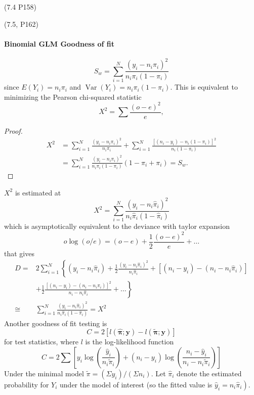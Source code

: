 \documentclass[11pt]{article}
\theoremstyle{definition}
\begin{document}
(7.4 P158)

(7.5, P162)
\paragraph{Binomial GLM Goodness of fit}
$$
S_w=\sum_{i=1}^N \frac{\left(y_i-n_i \pi_i\right)^2}{n_i \pi_i\left(1-\pi_i\right)}
$$
since $E\left(Y_i\right)=n_i \pi_i$ and $\operatorname{Var}\left(Y_i\right)=n_i \pi_i\left(1-\pi_i\right)$.
This is equivalent to minimizing the Pearson chi-squared statistic
$$
X^2=\sum \frac{(o-e)^2}{e},
$$
\begin{proof}
    $$
\begin{aligned}
X^2 & =\sum_{i=1}^N \frac{\left(y_i-n_i \pi_i\right)^2}{n_i \pi_i}+\sum_{i=1}^N \frac{\left[\left(n_i-y_i\right)-n_i\left(1-\pi_i\right)\right]^2}{n_i\left(1-\pi_i\right)} \\
& =\sum_{i=1}^N \frac{\left(y_i-n_i \pi_i\right)^2}{n_i \pi_i\left(1-\pi_i\right)}\left(1-\pi_i+\pi_i\right)=S_w .
\end{aligned}
$$
\end{proof}
$X^2$ is estimated at
$$
X^2=\sum_{i=1}^N \frac{\left(y_i-n_i \widehat{\pi}_i\right)^2}{n_i \widehat{\pi}_i\left(1-\widehat{\pi}_i\right)}
$$
which is asymptotically equivalent to the deviance
with taylor expansion
$$
o\log(o/e) = (o-e) + \frac{1}{2}\frac{(o-e)^2}{e}+\dots
$$
that gives
$$
\begin{aligned}
D = & 2 \sum_{i=1}^N\left\{\left(y_i-n_i \widehat{\pi}_i\right)+\frac{1}{2} \frac{\left(y_i-n_i \widehat{\pi}_i\right)^2}{n_i \widehat{\pi}_i}+\left[\left(n_i-y_i\right)-\left(n_i-n_i \widehat{\pi}_i\right)\right]\right. \\
& \left.+\frac{1}{2} \frac{\left[\left(n_i-y_i\right)-\left(n_i-n_i \widehat{\pi}_i\right)\right]^2}{n_i-n_i \widehat{\pi}_i}+\ldots\right\} \\
\cong & \sum_{i=1}^N \frac{\left(y_i-n_i \widehat{\pi}_i\right)^2}{n_i \widehat{\pi}_i\left(1-\widehat{\pi}_i\right)}=X^2 
\end{aligned}
$$
Another goodness of fit testing is 
$$
C=2[l(\widehat{\boldsymbol{\pi}} ; \mathbf{y})-l(\widetilde{\boldsymbol{\pi}} ; \mathbf{y})]
$$
for test statistics, where $l$ is the log-likelihood function
$$
C=2 \sum\left[y_i \log \left(\frac{\widehat{y}_i}{n_i \widetilde{\pi}_i}\right)+\left(n_i-y_i\right) \log \left(\frac{n_i-\widehat{y}_i}{n_i-n_i \widetilde{\pi}_i}\right)\right]
$$
Under the minimal model $\widetilde{\pi}=\left(\Sigma y_i\right) /\left(\Sigma n_i\right)$. Let $\widehat{\pi}_i$ denote the estimated probability for $Y_i$ under the model of interest (so the fitted value is $\left.\widehat{y}_i=n_i \widehat{\pi}_i\right)$.
\end{document}

